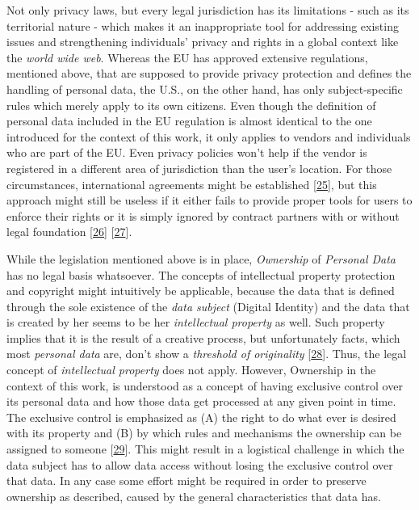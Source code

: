 \documentclass[12pt,english,a4paper,titlepage,cleardoublepage=empty,dottedtoc]{report}
\begin{document}
Not only privacy laws, but every legal jurisdiction has its limitations
- such as its territorial nature - which makes it an inappropriate tool
for addressing existing issues and strengthening individuals' privacy
and rights in a global context like the \emph{world wide web}. Whereas
the EU has approved extensive regulations, mentioned above, that are
supposed to provide privacy protection and defines the handling of
personal data, the U.S., on the other hand, has only subject-specific
rules which merely apply to its own citizens. Even though the definition
of personal data included in the EU regulation is almost identical to
the one introduced for the context of this work, it only applies to
vendors and individuals who are part of the EU. Even privacy policies
won't help if the vendor is registered in a different area of
jurisdiction than the user's location. For those circumstances,
international agreements might be established
{[}\protect\hyperlink{ref-web_2016_international-privacy-standards}{25}{]},
but this approach might still be useless if it either fails to provide
proper tools for users to enforce their rights or it is simply ignored
by contract partners with or without legal foundation
{[}\protect\hyperlink{ref-web_2017_privacy-shield_faq}{26}{]}
{[}\protect\hyperlink{ref-web_2017_privacy-shield_kritik}{27}{]}.

While the legislation mentioned above is in place,
\emph{\protect\hypertarget{def--ownership}{}{Ownership}} of
\emph{Personal Data} has no legal basis whatsoever. The concepts of
intellectual property protection and copyright might intuitively be
applicable, because the data that is defined through the sole existence
of the \emph{data subject} (Digital Identity) and the data that is
created by her seems to be her \emph{intellectual property} as well.
Such property implies that it is the result of a creative process, but
unfortunately facts, which most \emph{personal data} are, don't show a
\emph{threshold of originality}
{[}\protect\hyperlink{ref-paper_2014_who-owns-yours-data}{28}{]}. Thus,
the legal concept of \emph{intellectual property} does not apply.
However, \protect\hypertarget{def--ownership}{}{Ownership} in the
context of this work, is understood as a concept of having exclusive
control over its personal data and how those data get processed at any
given point in time. The exclusive control is emphasized as (A) the
right to do what ever is desired with its property and (B) by which
rules and mechanisms the ownership can be assigned to someone
{[}\protect\hyperlink{ref-book_1987_private-ownership_definition}{29}{]}.
This might result in a logistical challenge in which the data subject
has to allow data access without losing the exclusive control over that
data. In any case some effort might be required in order to preserve
ownership as described, caused by the general characteristics that data
has.
\end{document}
